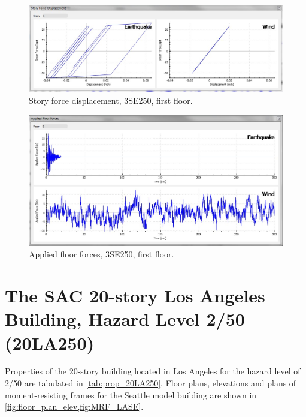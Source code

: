 \documentclass[onecolumn, fleqn]{article}
\begin{document}
\begin{figure}[H]
	\centering \includegraphics[scale=0.35]{3SE250_sfd.JPG}
	\caption{Story force displacement, 3SE250, first floor.}
\end{figure}
\begin{figure}[H]
	\centering \includegraphics[scale=0.35]{3SE250_aff.JPG}
	\caption{Applied floor forces, 3SE250, first floor.}
\end{figure}





\section{The SAC 20-story Los Angeles Building, Hazard Level 2/50 (20LA250)}
Properties of the 20-story building located in Los Angeles for the hazard level of 2/50 are tabulated in \cref{tab:prop_20LA250}. Floor plans, elevations and plans of moment-resisting frames for the Seattle model building are shown in \cref{fig:floor_plan_elev,fig:MRF_LASE}.
\end{document}
